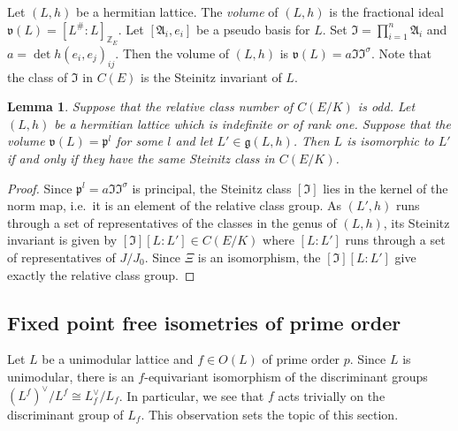 \documentclass{amsart}
\theoremstyle{definition}
\theoremstyle{plain}
\newtheorem{lemma}[definition]{Lemma}
\newcommand{\ZZ}{\mathbb{Z}}
\begin{document}
 Let $(L,h)$ be a hermitian lattice. The \emph{volume} of $(L,h)$ is the fractional ideal
 $\mathfrak{v}(L)=[L^\# : L]_{\ZZ_E}$. Let $[\mathfrak{A}_i,e_i]$ be a pseudo basis for $L$.
Set $\mathfrak{I} = \prod_{i=1}^n \mathfrak{A}_i$ and $a = \det h(e_i,e_j)_{ij}$. Then the volume of $(L,h)$ is $\mathfrak{v}(L)= a  \mathfrak{I} \mathfrak{I}^\sigma$.
 Note that the class of $\mathfrak{I}$ in $C(E)$ is the Steinitz invariant of $L$.
\begin{lemma}\label{lem:odd-relative-class}
Suppose that the relative class number of $C(E/K)$ is odd.
Let $(L,h)$ be a hermitian lattice which is indefinite or of rank one.
Suppose that the volume $\mathfrak{v}(L)=\mathfrak{p}^l$ for some $l$ and let $L' \in \mathfrak{g}(L,h)$.
Then $L$ is isomorphic to $L'$ if and only if they have the same Steinitz class in $C(E/K)$.
\end{lemma}
\begin{proof}
 Since $\mathfrak{p}^l = a \mathfrak{I} \mathfrak{I}^\sigma$ is principal, the Steinitz class $[\mathfrak{I}]$ lies in the kernel of the norm map, i.e.\ it is an element of the relative class group. As $(L',h)$ runs through a set of representatives of the classes in the genus of $(L,h)$, its Steinitz invariant is given by $[\mathfrak{I}] [L:L'] \in C(E/K)$ where $[L:L']$ runs through a set of representatives of $J/J_0$. Since $\Xi$ is an isomorphism, the $[\mathfrak{I}] [L:L']$ give exactly the relative class group.
\end{proof}


\subsection{Fixed point free isometries of prime order}
Let $L$ be a unimodular lattice and $f \in O(L)$ of prime order $p$.
Since $L$ is unimodular, there is an $f$-equivariant isomorphism
of the discriminant groups $(L^f)^\vee / L^f \cong L_f^\vee / L_f$.
In particular, we see that $f$ acts trivially on the discriminant group of $L_f$.
This observation sets the topic of this section.
\end{document}
